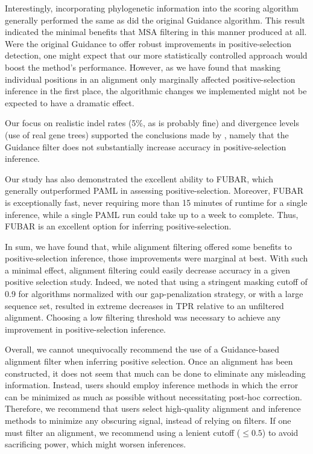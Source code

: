 \documentclass[11pt]{article}
\begin{document}
Interestingly, incorporating phylogenetic information into the scoring algorithm generally performed the same as did the original Guidance algorithm. This result indicated the minimal benefits that MSA filtering in this manner produced at all. Were the original Guidance to offer robust improvements in positive-selection detection, one might expect that our more statistically controlled approach would boost the method's performance. However, as we have found that masking individual positions in an alignment only marginally affected positive-selection inference in the first place, the algorithmic changes we implemented might not be expected to have a dramatic effect.

Our focus on realistic indel rates (5\%, as is probably fine) and divergence levels (use of real gene trees) supported the conclusions made by \citet{Jordan2012}, namely that the Guidance filter does not substantially increase accuracy in positive-selection inference.

Our study has also demonstrated the excellent ability to FUBAR, which generally outperformed PAML in assessing positive-selection. Moreover, FUBAR is exceptionally fast, never requiring more than 15 minutes of runtime for a single inference, while a single PAML run could take up to a week to complete. Thus, FUBAR is an excellent option for inferring positive-selection.

In sum, we have found that, while alignment filtering offered some benefits to positive-selection inference, those improvements were marginal at best. With such a minimal effect, alignment filtering could easily decrease accuracy in a given positive selection study. Indeed, we noted that using a stringent masking cutoff of 0.9 for algorithms normalized with our gap-penalization strategy, or with a large sequence set, resulted in extreme decreases in TPR relative to an unfiltered alignment. Choosing a low filtering threshold was necessary to achieve any improvement in positive-selection inference.  

Overall, we cannot unequivocally recommend the use of a Guidance-based alignment filter when inferring positive selection. Once an alignment has been constructed, it does not seem that much can be done to eliminate any misleading information. Instead, users should employ inference methods in which the error can be minimized as much as possible without necessitating post-hoc correction. Therefore, we recommend that users select high-quality alignment and inference methods to minimize any obscuring signal, instead of relying on filters. If one must filter an alignment, we recommend using a lenient cutoff ($\leq0.5$) to avoid sacrificing power, which might worsen inferences.
\end{document}
